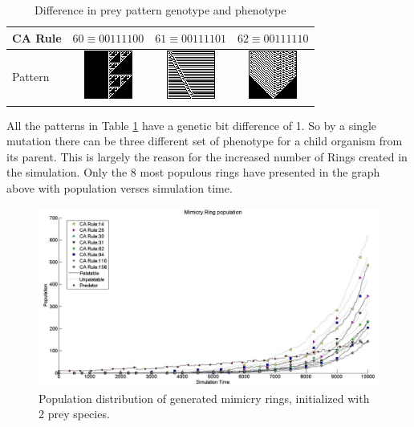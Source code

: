 \begin{table}[H]
\centering
\begin{tabular}{|l|c|c|c|}
  \hline
  CA Rule & \(60 \equiv 00111100\) & \(61 \equiv 00111101\) & \(62 \equiv 00111110 \) \\ \hline
  Pattern & \parbox[c]{2.1em}{\includegraphics[scale=0.50]{images/CARule60}} 
  				& \parbox[c]{2.1em}{\includegraphics[scale=0.50]{images/CARule61}} 
  				& \parbox[c]{2.1em}{\includegraphics[scale=0.50]{images/CARule62}}\\
  \hline
\end{tabular}
\caption{Difference in prey pattern genotype and phenotype}
\label{tab:diff-in-pattern}
\end{table}

All the patterns in Table \ref{tab:diff-in-pattern} have a genetic bit difference of 1. So by a single mutation there can be three different set of phenotype for a child organism from its parent. This is largely the reason for the increased number of Rings created in the simulation. Only the 8 most populous rings have presented in the graph above with population verses simulation time.

\begin{figure}[H]
	\centering
	\includegraphics[scale=0.40]{images/simTime10k-2Prey-generated-prey}
	\caption[Population distribution of generated mimicry rings (initialized with 2 prey species)]{Population distribution of generated mimicry rings, initialized with 2 prey species.}
	\label{fig:plot-2-prey-generated-prey}
\end{figure}

